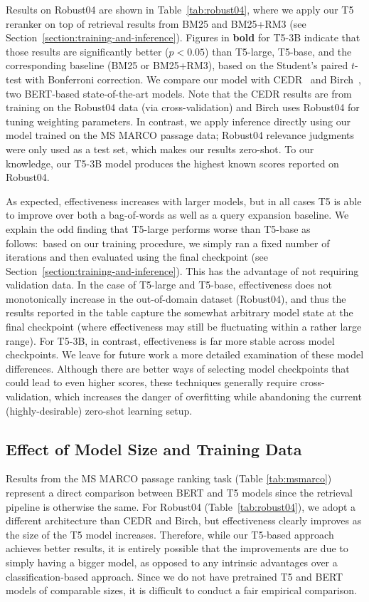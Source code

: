 \documentclass{article}
\begin{document}
Results on Robust04 are shown in Table~\ref{tab:robust04}, where we apply our T5 reranker on top of retrieval results from BM25 and BM25+RM3 (see Section~\ref{section:training-and-inference}).
Figures in \textbf{bold} for T5-3B indicate that those results are significantly better ($p<0.05$) than T5-large, T5-base, and the corresponding baseline (BM25 or BM25+RM3), based on the Student's paired $t$-test with Bonferroni correction.
We compare our model with CEDR~\cite{macavaney2019cedr} and Birch~\cite{yilmaz2019cross}, two BERT-based state-of-the-art models.
Note that the CEDR results are from training on the Robust04 data (via cross-validation) and Birch uses Robust04 for tuning weighting parameters.
In contrast, we apply inference directly using our model trained on the MS MARCO passage data; Robust04 relevance judgments were only used as a test set, which makes our results zero-shot.
To our knowledge, our T5-3B model produces the highest known scores reported on Robust04.

As expected, effectiveness increases with larger models, but in all cases T5 is able to improve over both a bag-of-words as well as a query expansion baseline.
We explain the odd finding that T5-large performs worse than T5-base as follows:\ based on our training procedure, we simply ran a fixed number of iterations and then evaluated using the final checkpoint (see Section~\ref{section:training-and-inference}).
This has the advantage of not requiring validation data.
In the case of T5-large and T5-base, effectiveness does not monotonically increase in the out-of-domain dataset (Robust04), and thus the results reported in the table capture the somewhat arbitrary model state at the final checkpoint (where effectiveness may still be fluctuating within a rather large range).
For T5-3B, in contrast, effectiveness is far more stable across model checkpoints.
We leave for future work a more detailed examination of these model differences.
Although there are better ways of selecting model checkpoints that could lead to even higher scores, these techniques generally require cross-validation, which increases the danger of overfitting while abandoning the current (highly-desirable) zero-shot learning setup.


\subsection{Effect of Model Size and Training Data}
\label{sec:model_size_training_data}

Results from the MS MARCO passage ranking task (Table \ref{tab:msmarco}) represent a direct comparison between BERT and T5 models since the retrieval pipeline is otherwise the same.
For Robust04 (Table~\ref{tab:robust04}), we adopt a different architecture than CEDR and Birch, but effectiveness clearly improves as the size of the T5 model increases.
Therefore, while our T5-based approach achieves better results, it is entirely possible that the improvements are due to simply having a bigger model, as opposed to any intrinsic advantages over a classification-based approach.
Since we do not have pretrained T5 and BERT models of comparable sizes, it is difficult to conduct a fair empirical comparison.
\end{document}
